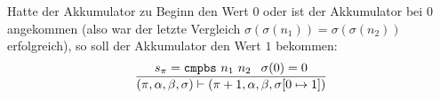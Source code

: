 \documentclass[main.tex]{subfiles}
\begin{document}
Hatte der Akkumulator zu Beginn den Wert $0$ oder ist der Akkumulator bei $0$ angekommen (also war der letzte Vergleich $\sigma ( \sigma ( n_{1})) =\sigma ( \sigma ( n_{2}))$ erfolgreich), so soll der Akkumulator den Wert $1$ bekommen:
\begin{equation*}
    \frac{
        s_{\pi } =\mathtt{cmpbs} \ n_{1} \ n_{2} \kern+0.4em \kern+0.4em \sigma ( 0) =0
    }{
        ( \pi ,\alpha ,\beta ,\sigma ) \vdash ( \pi +1,\alpha ,\beta ,\sigma [ 0\mapsto 1])
    }
\end{equation*}


\end{document}
